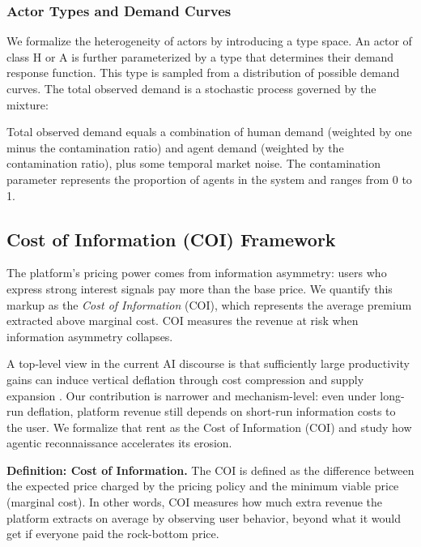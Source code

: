 \subsubsection{Actor Types and Demand Curves}

We formalize the heterogeneity of actors by introducing a type space. An actor of class H or A is further parameterized by a type that determines their demand response function. This type is sampled from a distribution of possible demand curves. The total observed demand is a stochastic process governed by the mixture:

Total observed demand equals a combination of human demand (weighted by one minus the contamination ratio) and agent demand (weighted by the contamination ratio), plus some temporal market noise. The contamination parameter represents the proportion of agents in the system and ranges from 0 to 1.

\subsection{Cost of Information (COI) Framework}

The platform's pricing power comes from information asymmetry: users who express strong interest signals pay more than the base price. We quantify this markup as the \textit{Cost of Information} (COI), which represents the average premium extracted above marginal cost. COI measures the revenue at risk when information asymmetry collapses.

A top-level view in the current AI discourse is that sufficiently large productivity gains can induce vertical deflation through cost compression and supply expansion \parencite{rachitsky_marc_2026}. Our contribution is narrower and mechanism-level: even under long-run deflation, platform revenue still depends on short-run information costs to the user. We formalize that rent as the Cost of Information (COI) and study how agentic reconnaissance accelerates its erosion.

\textbf{Definition: Cost of Information.} The COI is defined as the difference between the expected price charged by the pricing policy and the minimum viable price (marginal cost). In other words, COI measures how much extra revenue the platform extracts on average by observing user behavior, beyond what it would get if everyone paid the rock-bottom price.

